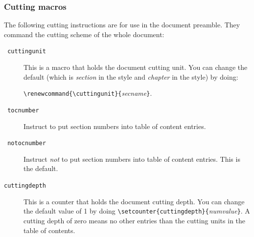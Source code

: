 \subsubsection{Cutting macros}
The following cutting instructions are for use in the document
preamble. They command the cutting scheme of the whole document:
%
%
\begin{description}
\item[{\tt{} cuttingunit}]
This is a macro that holds the document cutting unit. You can change
the default (which is {\em section} in the  style
and {\em chapter} in the  style)  by doing:
\begin{flushleft}
\verb+\renewcommand{\cuttingunit}{+{\it secname}\verb+}+.
\end{flushleft}
\item[{\tt{} tocnumber}] Instruct \hevea{} to put section numbers
into table of content entries.
\item[{\tt{} notocnumber}] Instruct \hevea{} \emph{not} to put
section numbers
into table of content entries. This is the default.
\item[{\tt cuttingdepth}]
This is a counter that holds the document cutting depth.
You can change the default value of 1 by doing
\verb+\setcounter{cuttingdepth}{+{\it numvalue}\verb+}+.
A cutting depth of zero means no other entries than the cutting units
in the table of contents.
\end{description}

